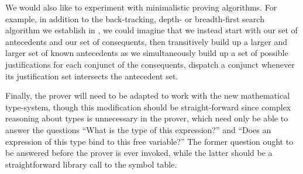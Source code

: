 We would also like to experiment with minimalistic proving algorithms.  For example, in addition to the back-tracking, depth- or breadth-first search algorithm we establish in \cite{smith10}, we could imagine that we instead start with our set of antecedents and our set of consequents, then transitively build up a larger and larger set of known antecedents as we simultaneously build up a set of possible justifications for each conjunct of the consequents, dispatch a conjunct whenever its justification set intersects the antecedent set. 

Finally, the prover will need to be adapted to work with the new mathematical type-system, though this modification should be straight-forward since complex reasoning about types is unnecessary in the prover, which need only be able to answer the questions ``What is the type of this expression?'' and ``Does an expression of this type bind to this free variable?''  The former question ought to be answered before the prover is ever invoked, while the latter should be a straightforward library call to the symbol table.

